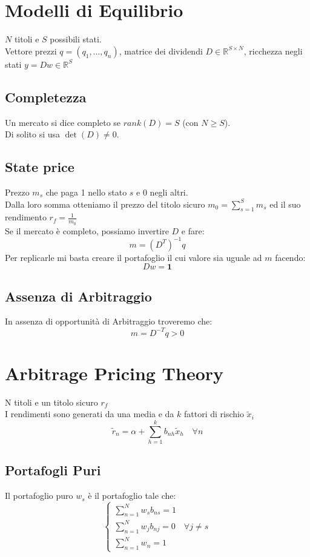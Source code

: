 \documentclass[a4paper,notitlepage]{report}%
\newcommand{\R}{\mathbb{R}}%
\begin{document}
\begin{multicols*}{2}
\section*{Modelli di Equilibrio}
    $N$ titoli e $S$ possibili stati. \\
    Vettore prezzi $q=(q_1,\dots,q_n)$,
    matrice dei dividendi $D\in\R^{S\times N}$,
    ricchezza negli stati $y=Dw\in\R^S$

    \subsection*{Completezza}
        Un mercato si dice completo se $rank(D)=S$ (con $N\geq S$).\\
        Di solito si usa $\det(D)\neq0$.

    \subsection*{State price}
    Prezzo $m_s$ che paga 1 nello stato $s$ e 0 negli altri.\\
    Dalla loro somma otteniamo il prezzo del titolo sicuro $m_0 = {\sum_{s=1}^S m_s}$
    ed il suo rendimento $r_f = \frac{1}{m_0}$\\
    Se il mercato è completo, possiamo invertire $D$ e fare:
    \[
        m=(D^T)^{-1} q   
    \]
    Per replicarle mi basta creare il portafoglio
    il cui valore sia uguale ad $m$ facendo:
    \[
        Dw=\mathbf{1}   
    \]

    \subsection*{Assenza di Arbitraggio}
    In assenza di opportunità di Arbitraggio troveremo che:
    \[
        m  = D^{-T}q > 0     
    \]


\section*{Arbitrage Pricing Theory}
    N titoli e un titolo sicuro $r_f$\\
    I rendimenti sono generati da una media e da $k$ fattori
    di rischio $\tilde{x}_i$
    \[
        \tilde{r}_n = \alpha + \sum_{h=1}^k b_{nh} \tilde{x}_h \quad \forall n  
    \]

    \subsection*{Portafogli Puri}
    Il portafoglio puro $w_s$ è il portafoglio tale che:
    \[
        \left\{\begin{array}{l}
            \sum_{n=1}^N w_s b_{ns} = 1 \\
            \sum_{n=1}^N w_j b_{nj} = 0 \quad \forall j\neq s \\
            \sum_{n=1}^N w_n  = 1
        \end{array}\right.  
    \]


\end{multicols*}
\end{document}
